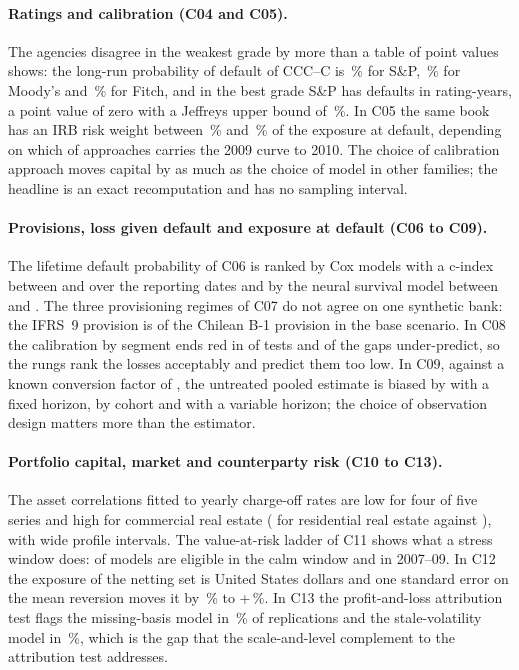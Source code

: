 \paragraph{Ratings and calibration (C04 and C05).} The agencies disagree in the weakest grade by more than a table of point values shows: the long-run probability of default of CCC--C is \rtgLraSpCCCC{}\,\% for S\&P, \rtgLraMoodysCCCC{}\,\% for Moody's and \rtgLraFitchCCCC{}\,\% for Fitch, and in the best grade S\&P has \rtgLradSpAAA{} defaults in \rtgLranSpAAA{} rating-years, a point value of zero with a Jeffreys upper bound of \rtgJeffupSpAAA{}\,\%. In C05 the same book has an IRB risk weight between \rsCFiveRwMin{}\,\% and \rsCFiveRwMax{}\,\% of the exposure at default, depending on which of \rsCFiveApproaches{} approaches carries the 2009 curve to 2010. The choice of calibration approach moves capital by as much as the choice of model in other families; the headline is an exact recomputation and has no sampling interval.

\paragraph{Provisions, loss given default and exposure at default (C06 to C09).} The lifetime default probability of C06 is ranked by Cox models with a c-index between \pvCindexCoxMin{} and \pvCindexCoxMax{} over the \pvDatesTotal{} reporting dates and by the neural survival model between \pvCindexPchMin{} and \pvCindexPchMax{}. The three provisioning regimes of C07 do not agree on one synthetic bank: the IFRS~9 provision is \rsCSevenRatio{} of the Chilean B-1 provision in the base scenario. In C08 the calibration by segment ends red in  of  tests and  of the gaps under-predict, so the rungs rank the losses acceptably and predict them too low. In C09, against a known conversion factor of \rsCNineTruth{}, the untreated pooled estimate is biased by \rsCNineFixed{} with a fixed horizon, \rsCNineCohort{} by cohort and \rsCNineVariable{} with a variable horizon; the choice of observation design matters more than the estimator.

\paragraph{Portfolio capital, market and counterparty risk (C10 to C13).} The asset correlations fitted to yearly charge-off rates are low for four of five series and high for commercial real estate (\ccRhoMlRes{} for residential real estate against \ccRhoMlCre{}), with wide profile intervals. The value-at-risk ladder of C11 shows what a stress window does: \mkEligCalm{} of \mkNModels{} models are eligible in the calm window and \mkEligGfc{} in 2007--09. In C12 the exposure of the netting set is \ccrEepeNetting{} United States dollars and one standard error on the mean reversion moves it by \ccrEepeAPlusPct{}\,\% to +\ccrEepeAMinusPct{}\,\%. In C13 the profit-and-loss attribution test flags the missing-basis model in \rsCThirteenMissing{}\,\% of replications and the stale-volatility model in \rsCThirteenStale{}\,\%, which is the gap that the scale-and-level complement to the attribution test addresses.

